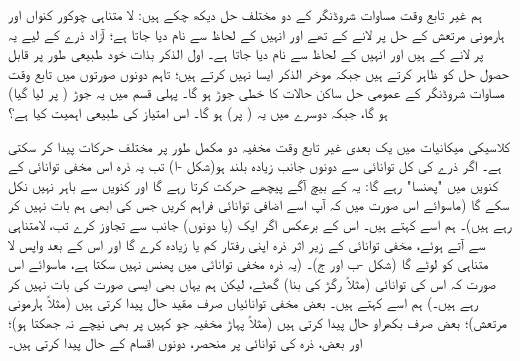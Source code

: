  ہم غیر تابع وقت مساوات شروڈنگر کے دو مختلف حل دیکھ چکے ہیں: لا متناہی چوکور کنواں اور ہارمونی مرتعش کے حل  پر لانے کے  تھے اور انہیں   کے لحاظ سے نام دیا جاتا ہے؛ آزاد ذرے کے لیے یہ  پر لانے کے  ہیں اور انہیں   کے لحاظ سے نام دیا جاتا ہے۔ اول الذکر بذات خود طبیعی طور پر قابل حصول حل کو ظاہر کرتے ہیں جبکہ موخر الذکر ایسا نہیں کرتے ہیں؛ تاہم دونوں صورتوں میں تابع وقت مساوات شروڈنگر کے عمومی حل ساکن حالات کا خطی جوڑ ہو گا۔ پہلی قسم میں یہ جوڑ ( پر لیا گیا)  ہو گا، جبکہ دوسرے میں یہ ( پر)  ہو گا۔ اس امتیاز کی طبیعی اہمیت کیا ہے؟

 کلاسیکی میکانیات میں یک بعدی غیر تابع وقت مخفیہ دو مکمل طور پر مختلف حرکات پیدا کر سکتی ہے۔ اگر  ذرے کی کل توانائی  سے دونوں جانب زیادہ بلند ہو(شکل -ا) تب یہ ذرہ اس مخفی توانائی کے کنویں  میں "پھنسا" رہے گا: یہ  کے بیچ آگے پیچھے حرکت کرتا رہے گا اور کنویں  سے باہر نہیں نکل سکے گا (ماسوائے اس صورت میں کہ آپ اسے اضافی توانائی فراہم کریں جس کی ابھی ہم بات نہیں کر رہے ہیں)۔ ہم اسے  کہتے ہیں۔ اس کے برعکس اگر  ایک (یا دونوں) جانب  سے تجاوز کرے تب، لامتناہی سے آتے ہوئے، مخفی توانائی کے زیر اثر ذرہ اپنی رفتار کم یا زیادہ کرے گا اور اس کے بعد واپس لا متناہی کو لوٹے گا (شکل -ب اور ج)۔ (یہ ذرہ مخفی توانائی میں پھنس نہیں سکتا ہے، ماسوائے اس صورت کہ اس کی توانائی (مثلاً رگڑ کی بنا) گھٹے، لیکن ہم یہاں بھی ایسی صورت کی بات نہیں کر رہے ہیں۔) ہم اسے  کہتے ہیں۔ بعض مخفی توانائیاں صرف مقید حال پیدا کرتی ہیں (مثلاً ہارمونی مرتعش)؛ بعض صرف بکھراو حال پیدا کرتی ہیں (مثلاً پہاڑ مخفیہ جو کہیں پر بھی نیچے نہ جھکتا ہو)؛ اور بعض، ذرہ کی توانائی پر منحصر، دونوں اقسام کے حال پیدا کرتی ہیں۔
